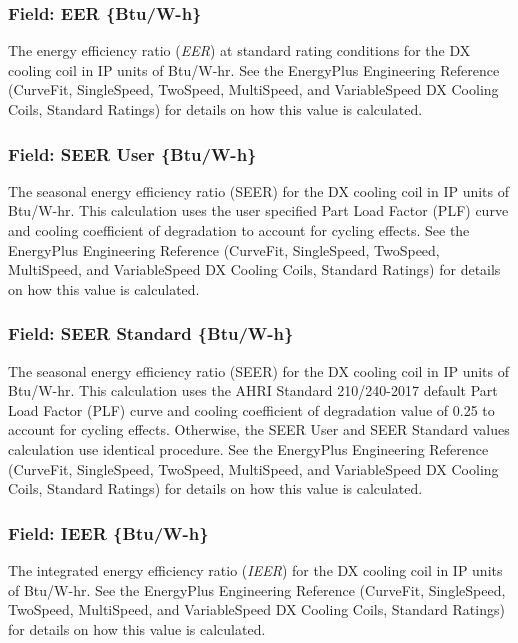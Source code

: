 \subsubsection{Field: EER \{Btu/W-h\}}

The energy efficiency ratio (\emph{EER}) at standard rating conditions for the DX cooling coil in IP units of Btu/W-hr. See the EnergyPlus Engineering Reference (CurveFit, SingleSpeed, TwoSpeed, MultiSpeed, and VariableSpeed DX Cooling Coils, Standard Ratings) for details on how this value is calculated.

\subsubsection{Field: SEER User \{Btu/W-h\}}

The seasonal energy efficiency ratio (SEER) for the DX cooling coil in IP units of Btu/W-hr. This calculation uses the user specified Part Load Factor (PLF) curve and cooling coefficient of degradation to account for cycling effects. See the EnergyPlus Engineering Reference (CurveFit, SingleSpeed, TwoSpeed, MultiSpeed, and VariableSpeed DX Cooling Coils, Standard Ratings) for details on how this value is calculated.

\subsubsection{Field: SEER Standard \{Btu/W-h\}}

The seasonal energy efficiency ratio (SEER) for the DX cooling coil in IP units of Btu/W-hr. This calculation uses the AHRI Standard 210/240-2017 default Part Load Factor (PLF) curve and cooling coefficient of degradation value of 0.25 to account for cycling effects. Otherwise, the SEER User and SEER Standard values calculation use identical procedure. See the EnergyPlus Engineering Reference (CurveFit, SingleSpeed, TwoSpeed, MultiSpeed, and VariableSpeed DX Cooling Coils, Standard Ratings) for details on how this value is calculated.

\subsubsection{Field: IEER \{Btu/W-h\}}

The integrated energy efficiency ratio (\emph{IEER}) for the DX cooling coil in IP units of Btu/W-hr. See the EnergyPlus Engineering Reference (CurveFit, SingleSpeed, TwoSpeed, MultiSpeed, and VariableSpeed DX Cooling Coils, Standard Ratings) for details on how this value is calculated.

